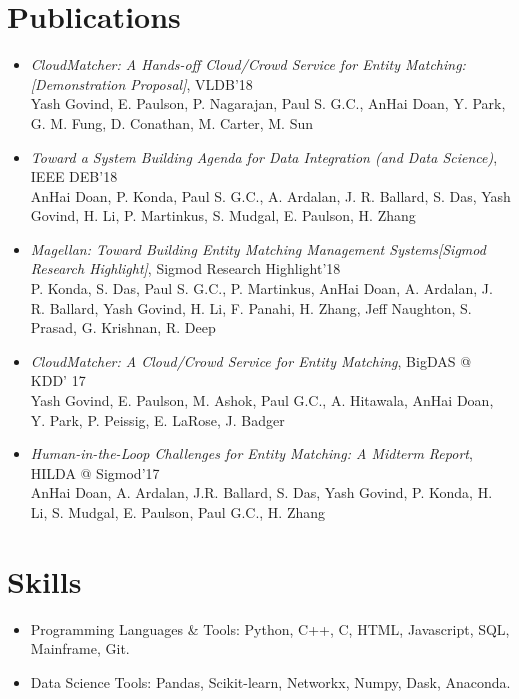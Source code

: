 \documentclass{resume}
\begin{document}
\section{Publications}
\begin{itemize}
  \item \emph{CloudMatcher: A Hands-off Cloud/Crowd Service for Entity Matching: [Demonstration Proposal]}, {VLDB'18} \\
Yash Govind, E. Paulson, P. Nagarajan, Paul S. G.C., AnHai Doan, Y. Park, G. M. Fung, D. Conathan, M. Carter, M. Sun
  \item \emph{Toward a System Building Agenda for Data Integration (and Data Science)}, {IEEE DEB'18} \\
AnHai Doan, P. Konda, Paul S. G.C., A. Ardalan, J. R. Ballard, S. Das, Yash Govind, H. Li, P. Martinkus, S. Mudgal, E. Paulson, H. Zhang
  \item \emph{Magellan: Toward Building Entity Matching Management Systems[Sigmod Research Highlight]}, {Sigmod Research Highlight'18} \\
P. Konda, S. Das, Paul S. G.C., P. Martinkus, AnHai Doan, A. Ardalan, J. R. Ballard, Yash Govind, H. Li, F. Panahi, H. Zhang, Jeff Naughton, S. Prasad, G. Krishnan, R. Deep
  \item \emph{CloudMatcher: A Cloud/Crowd Service for Entity Matching}, {BigDAS @ KDD' 17} \\
Yash Govind, E. Paulson, M. Ashok, Paul G.C., A. Hitawala, AnHai Doan, Y. Park, P. Peissig, E. LaRose, J. Badger
  \item \emph{Human-in-the-Loop Challenges for Entity Matching: A Midterm Report}, {HILDA @ Sigmod'17} \\
AnHai Doan, A. Ardalan, J.R. Ballard, S. Das, Yash Govind, P. Konda, H. Li, S. Mudgal, E. Paulson, Paul G.C., H. Zhang
\end{itemize}

\section{Skills}
\begin{itemize}[parsep=0.5ex]
  \item Programming Languages \& Tools: Python, C++, C, HTML, Javascript, SQL, Mainframe, Git.
  \item Data Science Tools: Pandas, Scikit-learn, Networkx, Numpy, Dask, Anaconda.
\end{itemize}

\end{document}
